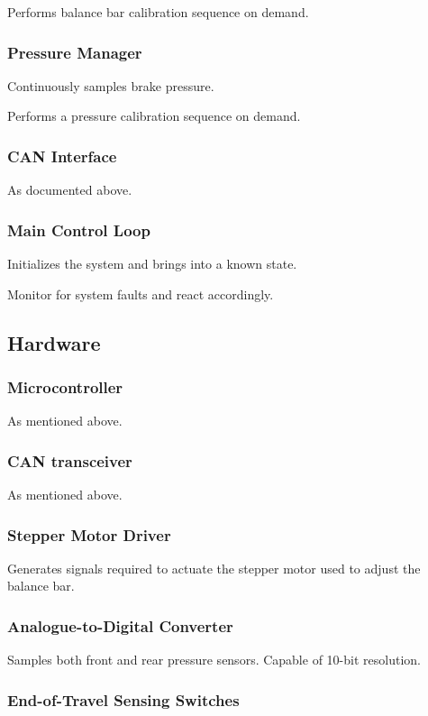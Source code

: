 Performs balance bar calibration sequence on demand.


\subsubsection{Pressure Manager}

Continuously samples brake pressure.

Performs a pressure calibration sequence on demand.


\subsubsection{CAN Interface}

As documented above.


\subsubsection{Main Control Loop}

Initializes the system and brings into a known state.

Monitor for system faults and react accordingly.


\subsection{Hardware}


\subsubsection{Microcontroller}

As mentioned above.


\subsubsection{CAN transceiver}

As mentioned above.


\subsubsection{Stepper Motor Driver}

Generates signals required to actuate the stepper motor used to adjust
the balance bar.


\subsubsection{Analogue-to-Digital Converter}

Samples both front and rear pressure sensors. Capable of 10-bit resolution.


\subsubsection{End-of-Travel Sensing Switches}